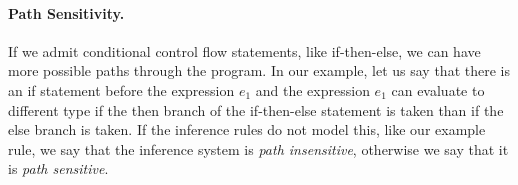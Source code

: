         \paragraph{Path Sensitivity.}        
        If we admit conditional control flow statements, like if-then-else, 
        we can have more possible paths through the program. In our example, 
        let us say that there is an if statement before the expression $e_1$
        and the expression $e_1$ can evaluate to different 
        type if the then branch of the if-then-else statement is taken than 
        if the else branch is taken. If the inference rules do not model this, 
        like our example rule, we say that the inference system is 
        \emph{path insensitive}, otherwise we say 
        that it is \emph{path sensitive}.
        
        
